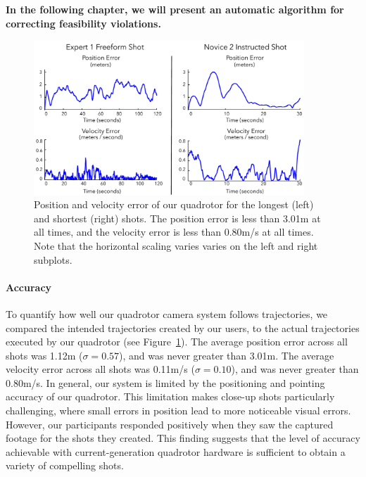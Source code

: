 \begin{tcolorbox}[before skip=20pt, after skip=20pt, sharp corners]
\begin{center}
\textbf{In the following chapter, we will present an automatic algorithm for correcting feasibility violations.}
\end{center}
\end{tcolorbox}

\begin{figure}[t]
\centering
\includegraphics[width=4.0in]{images/2015_siggraph_asia/errors.pdf}
\caption{
Position and velocity error of our quadrotor for the longest (left) and shortest (right) shots.
The position error is less than 3.01m at all times, and the velocity error is less than 0.80m/s at all times.
Note that the horizontal scaling varies varies on the left and right subplots. 
}
\label{fig:ch2:errors}
\end{figure}

\paragraph{Accuracy}
To quantify how well our quadrotor camera system follows trajectories, we compared the intended trajectories created by our users, to the actual trajectories executed by our quadrotor (see Figure~\ref{fig:ch2:errors}).
The average position error across all shots was 1.12m ($\sigma = 0.57$), and was never greater than 3.01m.
The average velocity error across all shots was 0.11m/s ($\sigma = 0.10$), and was never greater than 0.80m/s.
In general, our system is limited by the positioning and pointing accuracy of our quadrotor.
This limitation makes close-up shots particularly challenging, where small errors in position lead to more noticeable visual errors.
However, our participants responded positively when they saw the captured footage for the shots they created.
This finding suggests that the level of accuracy achievable with current-generation quadrotor hardware is sufficient to obtain a variety of compelling shots.

